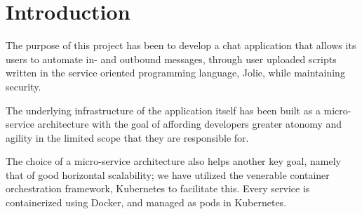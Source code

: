 
\section{Introduction}\label{sec:introduction}
The purpose of this project has been to develop a chat application that allows its users to automate in- and outbound messages,  through user uploaded scripts written in the service oriented programming language, Jolie, while maintaining security.

The underlying infrastructure of the application itself has been built as a micro-service architecture with the goal of affording developers greater atonomy and agility in the limited scope that they are responsible for.

The choice of a micro-service architecture also helps another key goal, namely that of good horizontal scalability; we have utilized the venerable container orchestration framework, Kubernetes to facilitate this. Every service is containerized using Docker, and managed as pods in Kubernetes.
